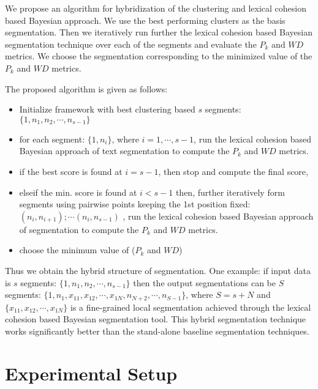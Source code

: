 \documentclass{article}
\begin{document}
We propose an algorithm for hybridization of the clustering and lexical cohesion based Bayesian approach. We use the best performing clusters as the basis segmentation. Then we iteratively run further the lexical cohesion based Bayesian segmentation technique over each of the segments and evaluate the $P_k$ and $WD$ metrics. We choose the segmentation corresponding to the minimized value of the $P_k$ and $WD$ metrics.

The proposed algorithm is given as follows:
\begin{itemize}
\item Initialize framework with best clustering based $s$ segments: $\{1,n_1,n_2,\cdots,n_{s-1}\}$
\item for each segment: $\{1,n_i\}$, where $i=1,\cdots,s-1$, run the lexical cohesion based Bayesian approach of text segmentation to compute the $P_k$ and $WD$ metrics.
\item if the best score is found at $i=s-1$, then stop and compute the final score, 
\item elseif the min. score is found at $i < s-1$ then, further iteratively form segments using pairwise points keeping the 1st position fixed: $(n_i,n_{i+1}); \cdots (n_i,n_{s-1})$ , run the lexical cohesion based Bayesian approach of segmentation to compute the $P_k$ and $WD$ metrics.
\item choose the minimum value of ($P_k$ and $WD$)
\end{itemize}

Thus we obtain the hybrid structure of segmentation. One example: if input data is $s$ segments: $\{1,n_1,n_2,\cdots,n_{s-1}\}$ then the output segmentations can be $S$ segments: 
$\{1,n_1,x_{11},x_{12},\cdots,x_{1N},n_{N+2},\cdots,n_{S-1}\}$, 
where $S=s+N$ and $\{x_{11},x_{12},\cdots,x_{1N}\}$ is a fine-grained local segmentation achieved through the lexical cohesion based Bayesian segmentation tool. This hybrid segmentation technique works significantly better than the stand-alone baseline segmentation techniques. 

\section{Experimental Setup}\label{sec:expt}
\end{document}
